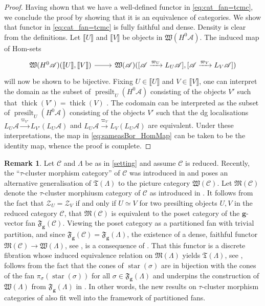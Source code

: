\documentclass[10pt,twoside, a4paper,reqno]{amsart}
\DeclareMathOperator{\presilt}{presilt}
\DeclareMathOperator{\thick}{thick}
\DeclareMathOperator{\starr}{star}
\newcommand{\eqclass}[1]{ \llbracket #1 \rrbracket }
\newcommand{\partfan}[1]{\mathfrak{F}_{\bfg}(#1)}
\newcommand{\tcmc}[1]{\mathfrak{W}(#1)}
\newcommand{\A}{\mathscr{A}}
\newcommand{\Wfrak}{\mathfrak{W}}
\newcommand{\calC}{\mathcal{C}}
\newcommand{\calZ}{\mathcal{Z}}
\newcommand{\bfg}{\mathbf{g}}
\theoremstyle{definition}
\newtheorem{remark}[theorem]{Remark}
\begin{document}
\begin{proof}
    Having shown that we have a well-defined functor in \eqref{eq:cat_fan=tcmc}, we conclude the proof by showing that it is an equivalence of categories. We show that functor in \eqref{eq:cat_fan=tcmc} is fully faithful and dense.
    Density is clear from the definitions. 
    Let $\eqclass{U}$ and $\eqclass{V}$ be objects in $\Wfrak(H^0\A)$.
    The induced map of Hom-sets
    \begin{equation}\label{eq:sameasBor_HomMap}
    \begin{tikzcd}
        \Wfrak(H^0\A)(\eqclass{U},\eqclass{V}) \arrow[r] & \tcmc{\A}([\A \xrightarrow{\varpi_U} {L_U\A}],[\A \xrightarrow{\varpi_V} {L_V\A}])
    \end{tikzcd}
    \end{equation}
    will now be shown to be bijective. Fixing $U\in\eqclass{U}$ and $V\in\eqclass{V}$, one can interpret the domain as the subset of $\presilt_U(H^0\A)$ consisting of the objects
    $V'$ such that $\thick(V')=\thick(V)$ {\cite[Cor. 3.6]{Kai23}}. The codomain can be interpreted as the subset of $\presilt_U(H^0\A)$ consisting of the objects $V'$ such that the dg localisations ${L_U\A} \xrightarrow{\varpi_{V'}} {L_{V'}}({L_U\A})$ and ${L_U\A} \xrightarrow{\varpi_{V}} {L_V}({L_U\A})$ are equivalent. Under these interpretations, the map in \eqref{eq:sameasBor_HomMap} can be taken to be the identity map, whence the proof is complete.
\end{proof}


\begin{remark}
	Let $\calC$ and $\Lambda$ be as in \cref{setting} and assume $\calC$ is reduced. Recently, the ``$\tau$-cluster morphism category'' of $\calC$ was introduced in \cite{Nonis2026} and poses an alternative generalisation of {$\mathfrak{T}(\Lambda)$} to the picture category $\Wfrak(\calC)$. Let $\mathfrak{M}(\calC)$ denote the $\tau$-cluster morphiusm category of $\calC$ as introduced in \cite[{§}7]{Nonis2026}. It follows from the fact that $\calZ_U = \calZ_V$ if and only if $U \simeq V$ for two presilting objects $U,V$ in the reduced category $\calC$, that $\mathfrak{M}(\calC)$ is equivalent to the poset category of the $\bfg$-vector fan $\partfan{\calC}$. Viewing the poset category as a partitioned fan with trivial partition, and since $\partfan{\calC}= \partfan{\Lambda}$, the existence of a dense, faithful functor $\mathfrak{M}(\calC) \to \Wfrak(\Lambda)$, see \cite[Thm. 8.3]{Nonis2026}, is a consequence of \cite[Thm. 1.3(a)]{Kai23}. That this functor is a discrete fibration whose induced equivalence relation on $\mathfrak{M}(\Lambda)$ yields {$\mathfrak{T}(\Lambda)$}, see \cite[Thm. 8.3, Thm. 8.8]{Nonis2026}, follows from the fact that the cones of $\starr(\sigma)$ are in bijection with the cones of the fan $\pi_{\sigma}(\starr(\sigma))$ for all $\sigma \in \partfan{\Lambda}$ and underpins the construction of $\Wfrak(\Lambda)$ from $\partfan{\Lambda}$ in \cite{STTW23}. In other words, the new results on $\tau$-cluster morphism categories of \cite{Nonis2026} also fit well into the framework of partitioned fans. 
\end{remark}
\end{document}
